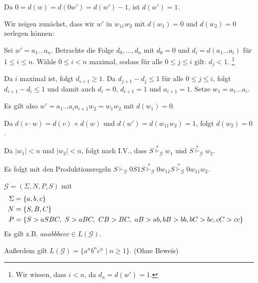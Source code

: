 \begin{Bsp}
\begin{description}[font=\normalfont]
  Da $0 = d(w) = d(0w') = d(w') - 1$, ist $d(w') = 1$.
  
  \medskip

  Wir zeigen zunächst, dass wir $w'$ in $w_11w_2$ mit $d(w_1) = 0$ und $d(w_2) = 0$ zerlegen können:

    Sei $w' = a_1 \ldots a_n$.
    Betrachte die Folge $d_0,\ldots,d_n$ mit $d_0 = 0$ und $d_i = d(a_1\ldots a_i)$ für $1 \le i \leq n$.
    Wähle $0 \le i < n$ maximal, sodass für alle $0 \le j \le i$ gilt: $d_j < 1$.%
    \footnote{Wir wissen, dass $i < n$, da $d_n = d(w') = 1$.}

    Da $i$ maximal ist, folgt $d_{i+1} \ge 1$.
    Da $d_{j+1} - d_j \le 1$ für alle $0 \le j \le i$, folgt $d_{i+1} - d_i \le 1$ und damit auch $d_i = 0$, $d_{i+1} = 1$ und $a_{i+1} = 1$.
    Setze $w_1 = a_1\ldots a_{i}$.

    Es gilt also $w' = a_1\ldots a_{i}a_{i+1}w_2 = w_1w_2$ mit $d(w_1) = 0$.

    Da $d(v \cdot w) = d(v) + d(w)$ und $d(w') = d(w_11w_2) = 1$, folgt $d(w_2) = 0$.
  \bigskip
  \goodbreak

  Da $|w_1| < n$ und $|w_2| < n$, folgt nach I.V., dass $S \stackrel{*}{\vdash}_{\mathcal{G}} w_1$ und $S \stackrel{*}{\vdash}_{\mathcal{G}} w_2$.

  Es folgt mit den Produktionsregeln $S \vdash_{\mathcal{G}} 0S1S \stackrel{*}{\vdash}_{\mathcal{G}} 0w_11S \stackrel{*}{\vdash}_{\mathcal{G}} 0w_11w_2$.
  \qedhere
\end{description}
\end{Bsp}

\begin{Bsp}\label{bsp:3.anbncn}
	$\mathcal{G}=(\Sigma,N,P,S)$ mit
	\begin{align*}
		\Sigma &= \{a,b,c\}\\
		N &= \{S,B,C\}\\
		P &= 
		\begin{aligned}[t]
			 \{ &S \-> aSBC,\ S\->aBC,\ CB\-> BC,\ aB\-> ab,
			bB\-> bb, bC\-> bc, cC\-> cc \}
		\end{aligned}
	\end{align*}
Es gilt z.B. $aaabbbccc\in L(\mathcal{G})$.

Außerdem gilt $L(\mathcal{G}) =  \{ a^nb^nc^n \mid n\geq 1 \}$. (Ohne Beweis)
\end{Bsp}

